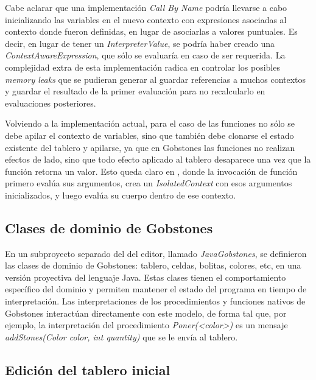 Cabe aclarar que una implementación \textit{Call By Name} podría llevarse a cabo inicializando las variables en el nuevo contexto con expresiones asociadas al contexto donde fueron definidas, en lugar de asociarlas a valores puntuales. Es decir, en lugar de tener un \textit{InterpreterValue}, se podría haber creado una \textit{ContextAwareExpression}, que sólo se evaluaría en caso de ser requerida. La complejidad extra de esta implementación radica en controlar los posibles \textit{memory leaks} que se pudieran generar al guardar referencias a muchos contextos y guardar el resultado de la primer evaluación para no recalcularlo en evaluaciones posteriores.

Volviendo a la implementación actual, para el caso de las funciones no sólo se debe apilar el contexto de variables, sino que también debe clonarse el estado existente del tablero y apilarse, ya que en Gobstones las funciones no realizan efectos de lado, sino que todo efecto aplicado al tablero desaparece una vez que la función retorna un valor. Esto queda claro en , donde la invocación de función primero evalúa sus argumentos, crea un \textit{IsolatedContext} con esos argumentos inicializados, y luego evalúa su cuerpo dentro de ese contexto.


\subsection{Clases de dominio de Gobstones}

En un subproyecto separado del del editor, llamado \textit{JavaGobstones}, se definieron las clases de dominio de Gobstones: tablero, celdas, bolitas, colores, etc, en una versión proyectiva del lenguaje Java. Estas clases tienen el comportamiento específico del dominio y permiten mantener el estado del programa en tiempo de interpretación. Las interpretaciones de los procedimientos y funciones nativos de Gobstones interactúan directamente con este modelo, de forma tal que, por ejemplo, la interpretación del procedimiento \textit{Poner(<color>)} es un mensaje \textit{addStones(Color color, int quantity)} que se le envía al tablero.

\subsection{Edición del tablero inicial}

